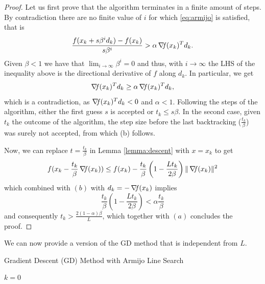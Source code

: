 \documentclass[10pt,a4paper]{article}
\begin{document}
\begin{proof}
	Let us first prove that the algorithm terminates in a finite amount of steps. By contradiction there are no finite value of $i$ for which \eqref{eq:armijo} is satisfied, that is 
	\begin{equation*}
		\frac{f(x_k +s \beta^i d_k)- f(x_k)}{s \beta^i} > \alpha \operatorname*{\mathit{\nabla \!f}}(x_k)^Td_k.
	\end{equation*}
Given $\beta<1$ we have that $\lim_{i\to \infty} \beta^i =0$ and thus, with $i\to \infty$ the LHS of the inequality above is the directional derivative of $f$ along $d_k$. In particular, we get
\begin{equation*}
	\operatorname*{\mathit{\nabla \!f}}(x_k)^Td_k \geq \alpha\operatorname*{\mathit{\nabla \!f}}(x_k)^Td_k,
\end{equation*}
which is a contradiction, as $\operatorname*{\mathit{\nabla \!f}}(x_k)^Td_k<0$ and $\alpha <1$.
Following the steps of the algorithm, either the first guess $s$ is accepted or $t_k\leq s\beta$. In the second case, given $t_k$ the outcome of the algorithm, the step size before the last backtracking ($\frac{t_k}{\beta}$) was surely not accepted, from which (b) follows.
\par Now, we can replace $t=\frac{t_k}{\beta}$ in Lemma \ref{lemma:descent} with $x=x_k$ to get
\begin{equation*}
	f(x_k -\frac{t_k}{\beta} \operatorname*{\mathit{\nabla \!f}}(x_k)) \leq f(x_k) - \frac{t_k}{\beta} \left(1-\frac{L t_k}{2\beta}\right) \| \operatorname*{\mathit{\nabla \!f}}(x_k)\|^2
\end{equation*}
which combined with $(b)$ with $d_k=-\operatorname*{\mathit{\nabla \!f}}(x_k)$ implies
\begin{equation*}
	\frac{t_k}{\beta}\left(1-\frac{L t_k}{2\beta}\right) < \alpha\frac{t_k}{\beta}
\end{equation*}
and consequently $t_k>\frac{2(1-\alpha)\beta}{L}$, which together with $(a)$ concludes the proof.
\end{proof}
\noindent We can now provide a version of the GD method that is independent from $L$.\\
\begin{algorithm}[H]\label{alg:gd_armijo}
	\caption{Gradient Descent (GD) Method with Armijo Line Search}
	
	
	$k = 0$
	
\end{algorithm}
\end{document}

